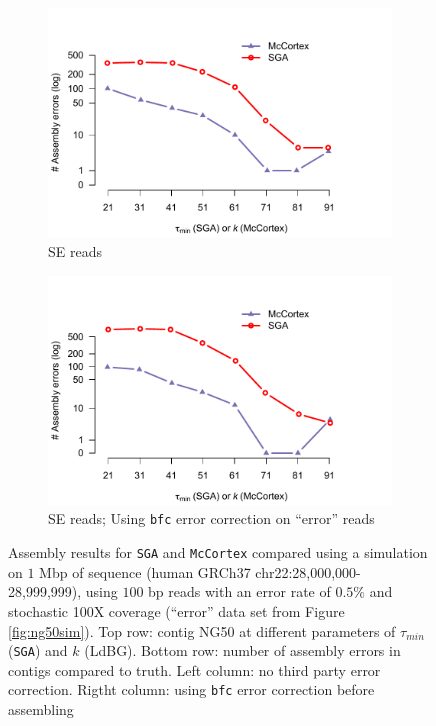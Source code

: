\documentclass[a4paper]{article}
\begin{document}
\begin{figure}[H]
\begin{subfigure}{.45\textwidth}
\includegraphics[width=1\linewidth]{../links-vs-sga-errs.pdf}
\caption{SE reads}
\end{subfigure}
\begin{subfigure}{.45\textwidth}
\centering
\includegraphics[width=1\linewidth]{../corr-links-vs-sga-errs.pdf}
\caption{SE reads; Using \texttt{bfc} error correction on ``error'' reads}
\end{subfigure}
\caption{Assembly results for \texttt{SGA} and \texttt{McCortex} compared using a simulation on $1$ Mbp of sequence (human GRCh37 chr22:28,000,000-28,999,999), using $100$ bp reads with an error rate of $0.5\%$ and stochastic 100X coverage (``error'' data set from Figure \ref{fig:ng50sim}). Top row: contig NG50 at different parameters of $\tau_{min}$ (\texttt{SGA}) and $k$ (LdBG). Bottom row: number of assembly errors in contigs compared to truth. Left column: no third party error correction. Rigtht column: using \texttt{bfc} error correction before assembling}
\label{fig:sga-vs-mccortex}
\end{figure}
\end{document}

